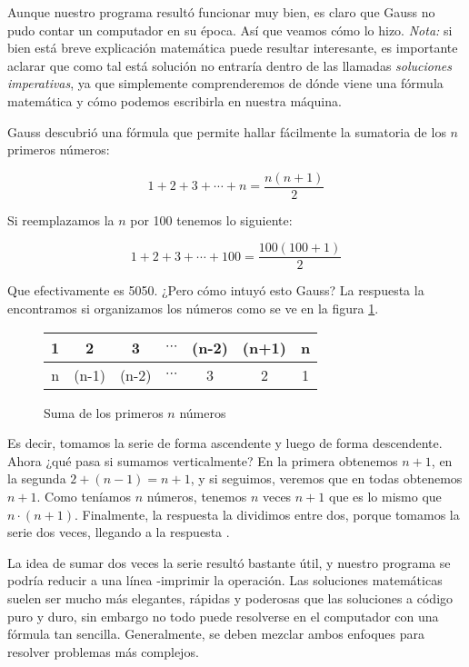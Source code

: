 Aunque nuestro programa resultó funcionar muy bien, es claro que Gauss no pudo contar un computador en su época. Así que veamos cómo lo hizo. \emph{Nota:} si bien está breve explicación matemática puede resultar interesante, es importante aclarar que como tal está solución no entraría dentro de las llamadas \emph{soluciones imperativas}, ya que simplemente comprenderemos de dónde viene una fórmula matemática y cómo podemos escribirla en nuestra máquina.

Gauss descubrió una fórmula que permite hallar fácilmente la sumatoria de los $n$ primeros números:

\begin{equation}
1+2+3+\cdots+n = \frac{n(n+1)}{2}
\end{equation}

Si reemplazamos la $n$ por 100 tenemos lo siguiente:

\begin{equation}
1+2+3+\cdots+100 = \frac{100(100+1)}{2}
\end{equation}

Que efectivamente es 5050. ¿Pero cómo intuyó esto Gauss? La respuesta la encontramos si organizamos los números como se ve en la figura \ref{figgauss}.

\begin{figure}[h!]
\centering
\begin{tabular}{| c | c | c | c | c | c | c |}
\hline
1 & 2 & 3 & $\cdots$ & (n-2) & (n+1) & n \\ \hline
n & (n-1) & (n-2) & $\cdots$ & 3 & 2 & 1 \\ \hline
\end{tabular}
\caption{Suma de los primeros $n$ números}
\label{figgauss}
\end{figure}

Es decir, tomamos la serie de forma ascendente y luego de forma descendente. Ahora ¿qué pasa si sumamos verticalmente? En la primera obtenemos $n+1$, en la segunda $2+(n-1)=n+1$, y si seguimos, veremos que en todas obtenemos $n+1$. Como teníamos $n$ números, tenemos $n$ veces $n+1$ que es lo mismo que $n \cdot (n+1)$. Finalmente, la respuesta la dividimos entre dos, porque tomamos la serie dos veces, llegando a la respuesta \cite{graham1994concrete}.

La idea de sumar dos veces la serie resultó bastante útil, y nuestro programa se podría reducir a una línea -imprimir la operación. Las soluciones matemáticas suelen ser mucho más elegantes, rápidas y poderosas que las soluciones a código puro y duro, sin embargo no todo puede resolverse en el computador con una fórmula tan sencilla. Generalmente, se deben mezclar ambos enfoques para resolver problemas más complejos.




